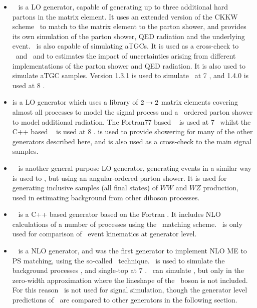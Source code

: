\begin{itemize}
    \item \sherpa~\cite{Gleisberg:2008ta} is a LO generator, capable of
    generating up to three additional hard partons in the matrix element. It
    uses an extended version of the CKKW scheme~\cite{Hoeche:2009rj} to match to the matrix element to the parton shower,
    and provides its own simulation of the parton shower, QED radiation and
    the underlying event. \sherpa\ is also capable of simulating aTGCs. It is
    used as a cross-check to \powhegbox\ and \ggZZ\ and to estimates the impact
    of uncertainties
    arising from different implementations of the parton shower and QED
    radiation. It is also used to simulate aTGC samples.
    Version 1.3.1 is used to simulate \qqZZllll\ at 7 \tev, and 1.4.0 is used at
    8 \tev.

    \item \pythia is a LO generator which uses a library of $2\rightarrow2$
    matrix elements covering almost all \sm processes to model the signal
    process and a \pt\ ordered parton shower to model additional radiation.
    The Fortran77 based
    ~\cite{pythia} is used at 7 \tev\, whilst the C++ based
    ~\cite{Sjostrand:2007gs} is used at 8 \tev. \pythia is used to
    provide showering for many of the other generators described here, and is
    also used as a cross-check to the main signal samples.

    \item \herwig~\cite{Herwig} is another general purpose LO generator, generating events in a
    similar way is used to \pythia, but using an angular-ordered parton shower.
    It is used for generating inclusive samples (all final
    states) of $WW$ and $WZ$ production, used in estimating background from
    other diboson processes.

    \item \herwigPP~\cite{Bahr:2008pv} is a C++ based generator based on the
    Fortran \herwig. It includes NLO calculations of a number of processes
    using the \powheg\ matching scheme. \herwigPP\ is only used for comparison
    of \ZZ\ event kinematics at generator level.

    \item \mcatnlo~\cite{bib:mcatnlo} is a NLO generator, and was the first
    generator to implement NLO ME to PS matching, using the so-called \mcatnlo\
    technique. \mcatnlo\ is used to simulate the background processes \ttbar, \Wt
    and single-top at 7 \tev. \mcatnlo\ can simulate \qqZZ, but only in the
    zero-width approximation where the lineshape of the \Z\ boson is not
    included. For this reason \mcatnlo\ is not used for signal simulation,
    though the generator level predictions of \mcatnlo\ are compared to other
    generators in the following section.


\end{itemize}
